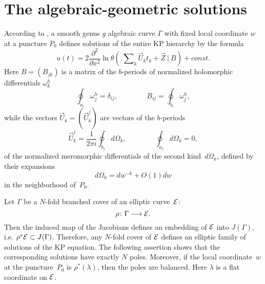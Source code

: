 \documentclass[a4paper,11pt]{article}
\newcommand{\p}{\partial}
\newcommand{\cE}{{\cal E}}
\newcommand{\vU}{\Vec{U}}
\newcommand{\vZ}{\Vec{Z}}
\theoremstyle{plain}
\theoremstyle{remark}
\begin{document}
\section{The algebraic-geometric solutions}

According to \cite{kr}, a smooth genus $g$ algebraic curve
$\Gamma$ with fixed local coordinate $w$ at a puncture $P_0$ defines solutions
of the entire KP hierarchy by the formula
$$
u(t)=2\frac{\p^2}{\p x^2} \ln \theta
\left(\biggl. \sum\nolimits_k \vU_k t_k + \vZ\ \bigr|\ B\right)+const .
$$
Here $B=(B_{jk})$ is a matrix of the $b$-periods of normalized holomorphic
differentials $\omega^h_k$
\begin{equation}\label{hd}
\oint_{a_i}\omega^h_j=\delta_{ij},\qquad\qquad
B_{ij}=\oint_{b_i}\omega^h_j,
\end{equation}
while the vectors $\vU_k=(\vU_k^j)$ are vectors of the $b$-periods
$$
\vU_k^{j}=\frac{1}{2\pi i}\oint_{b_j}d\Omega_k,\qquad\qquad
\oint_{a_j}d\Omega_k=0,
$$
of the normalized meromorphic differentials of the second kind~$d\Omega_k$,
defined by their expansions
\begin{equation}\label{om}
d\Omega_k=dw^{-k}+O(1)dw
\end{equation}
in the neighborhood of~$P_0$.

Let $\Gamma$ be a $N$-fold branched cover of an elliptic curve~$\cE$:
$$
\rho\colon\Gamma\longrightarrow\cE .
$$
Then the induced map of the Jacobians defines an embedding of
$\cal E$ into $J(\Gamma)$, i.e. $\rho^*\cE\subset J(\Gamma)$.
Therefore, any $N$-fold cover of $\cal E$ defines an elliptic family
of solutions of the KP equation. The following assertion shows that
the corresponding solutions have exactly $N$ poles.
Moreover, if the local coordinate~$w$ at
the puncture~$P_0$ is $\rho^*(\lambda)$, then the poles are balanced.
Here $\lambda$ is a flat coordinate on $\cE$.
\end{document}
